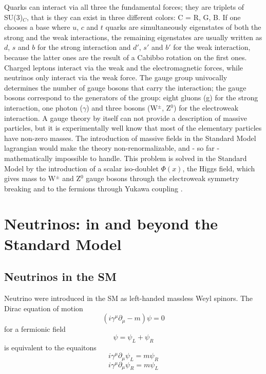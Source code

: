 Quarks can interact via all three the fundamental forces; they are triplets of SU(3)$_C$, that is they can exist in three different colors: C = R, G, B. If one chooses a base where $u$, $c$ and $t$ quarks are simultaneously eigenstates of both the strong and the weak interactions, the remaining eigenstates are usually written as $d$, $s$ and $b$ for the strong interaction and $d'$, $s'$ and $b'$ for the weak interaction, because the latter ones are the result of a Cabibbo rotation on the first ones.
Charged leptons interact via the weak and the electromagnetic forces, while neutrinos only interact via the weak force. 
The gauge group univocally determines the number of gauge bosons that carry the interaction; the gauge bosons correspond to the generators of the group: eight gluons (g) for the strong interaction, one photon ($\gamma$) and three bosons (W$^\pm$, Z$^0$) for the electroweak interaction.
A gauge theory by itself can not provide a description of massive particles, but it is experimentally well know that most of the elementary particles have non-zero masses. The introduction of massive fields in the Standard Model lagrangian would make the theory non-renormalizable, and - so far - mathematically impossible to handle. This problem is solved in the Standard Model by the introduction of a scalar iso-doublet $\Phi(x)$, the Higgs field, which gives mass to W$^\pm$ and Z$^0$ gauge bosons through the electroweak symmetry breaking and to the fermions through Yukawa coupling \cite{Higgs1964,Higgs19642}.

\section{Neutrinos: in and beyond the Standard Model}
\subsection{Neutrinos in the SM}
Neutrino were introduced in the SM as left-handed massless Weyl spinors.
The Dirac equation of motion
\begin{equation}
(i\gamma^ \mu \partial_\mu - m) \psi = 0
\end{equation}
for a fermionic field 
\begin{equation}
 \psi =  \psi_L +  \psi_R
\end{equation}
is equivalent to the equaitons
\begin{equation}
i\gamma^ \mu \partial_\mu  \psi_L = m \psi_R
\end{equation}
\begin{equation}
i\gamma^ \mu \partial_\mu  \psi_R = m \psi_L
\end{equation}

